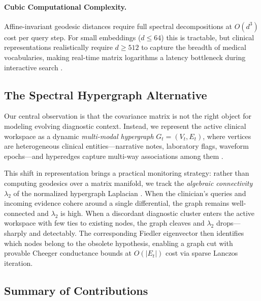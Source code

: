 \documentclass[10pt, onecolumn]{article}
\begin{document}
\paragraph{Cubic Computational Complexity.}
Affine-invariant geodesic distances require full spectral decompositions at $O(d^3)$ cost per query step. For small embeddings ($d \le 64$) this is tractable, but clinical representations realistically require $d \ge 512$ to capture the breadth of medical vocabularies, making real-time matrix logarithms a latency bottleneck during interactive search \cite{huang2017riemannian}.

\subsection{The Spectral Hypergraph Alternative}

Our central observation is that the covariance matrix is not the right object for modeling evolving diagnostic context. Instead, we represent the active clinical workspace as a dynamic \emph{multi-modal hypergraph} $G_t = (V_t, E_t)$, where vertices are heterogeneous clinical entities---narrative notes, laboratory flags, waveform epochs---and hyperedges capture multi-way associations among them \cite{zhou2006learning}.

This shift in representation brings a practical monitoring strategy: rather than computing geodesics over a matrix manifold, we track the \emph{algebraic connectivity} $\lambda_2$ of the normalized hypergraph Laplacian \cite{fiedler1973algebraic,chung1997spectral}. When the clinician's queries and incoming evidence cohere around a single differential, the graph remains well-connected and $\lambda_2$ is high. When a discordant diagnostic cluster enters the active workspace with few ties to existing nodes, the graph cleaves and $\lambda_2$ drops---sharply and detectably. The corresponding Fiedler eigenvector then identifies which nodes belong to the obsolete hypothesis, enabling a graph cut with provable Cheeger conductance bounds at $O(|E_t|)$ cost via sparse Lanczos iteration.

\subsection{Summary of Contributions}
\end{document}
